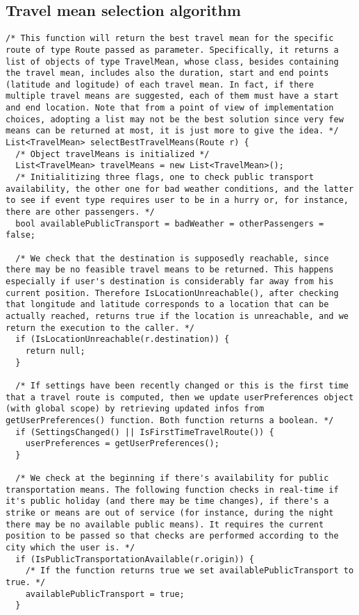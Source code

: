 \subsection*{Travel mean selection algorithm}
\begin{tcolorbox}
\begin{verbatim}
/* This function will return the best travel mean for the specific route of type Route passed as parameter. Specifically, it returns a list of objects of type TravelMean, whose class, besides containing the travel mean, includes also the duration, start and end points (latitude and logitude) of each travel mean. In fact, if there multiple travel means are suggested, each of them must have a start and end location. Note that from a point of view of implementation choices, adopting a list may not be the best solution since very few means can be returned at most, it is just more to give the idea. */ 
List<TravelMean> selectBestTravelMeans(Route r) {
  /* Object travelMeans is initialized */
  List<TravelMean> travelMeans = new List<TravelMean>();
  /* Initialitizing three flags, one to check public transport availability, the other one for bad weather conditions, and the latter to see if event type requires user to be in a hurry or, for instance, there are other passengers. */
  bool availablePublicTransport = badWeather = otherPassengers = false;

  /* We check that the destination is supposedly reachable, since there may be no feasible travel means to be returned. This happens especially if user's destination is considerably far away from his current position. Therefore IsLocationUnreachable(), after checking that longitude and latitude corresponds to a location that can be actually reached, returns true if the location is unreachable, and we return the execution to the caller. */
  if (IsLocationUnreachable(r.destination)) {
    return null;
  }
  
  /* If settings have been recently changed or this is the first time that a travel route is computed, then we update userPreferences object (with global scope) by retrieving updated infos from getUserPreferences() function. Both function returns a boolean. */
  if (SettingsChanged() || IsFirstTimeTravelRoute()) {
    userPreferences = getUserPreferences();
  }

  /* We check at the beginning if there's availability for public transportation means. The following function checks in real-time if it's public holiday (and there may be time changes), if there's a strike or means are out of service (for instance, during the night there may be no available public means). It requires the current position to be passed so that checks are performed according to the city which the user is. */
  if (IsPublicTransportationAvailable(r.origin)) {
    /* If the function returns true we set availablePublicTransport to true. */
    availablePublicTransport = true;
  }
  

\end{verbatim}
\end{tcolorbox}
